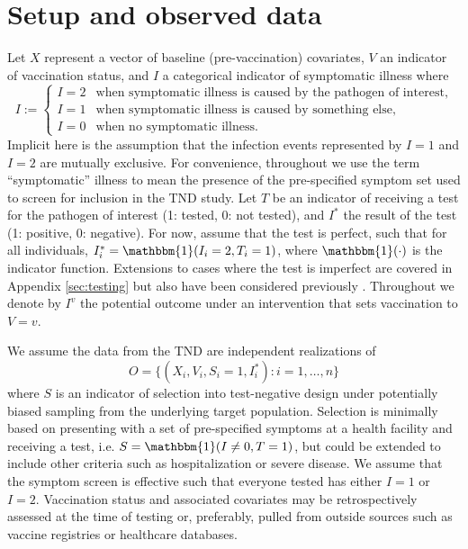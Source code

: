 \documentclass[11pt]{article}
\begin{document}
\section{Setup and observed data} \label{sec:setup}
Let $X$ represent a vector of baseline (pre-vaccination) covariates, $V$ an indicator of vaccination status, and $I$ a categorical indicator of symptomatic illness where
        $$I := \begin{cases} 
        I = 2 & \text{when symptomatic illness is caused by the pathogen of interest}, \\
        I = 1 & \text{when symptomatic illness is caused by something else}, \\
        I = 0 & \text{when no symptomatic illness}.
        \end{cases}$$
 Implicit here is the assumption that the infection events represented by $I = 1$ and $I = 2$ are mutually exclusive. For convenience, throughout we use the term ``symptomatic'' illness to mean the presence of the pre-specified symptom set used to screen for inclusion in the TND study. Let $T$ be an indicator of receiving a test for the pathogen of interest (1: tested, 0: not tested), and $I^*$ the result of the test (1: positive, 0: negative). For now, assume that the test is perfect, such that for all individuals, $I^*_i = \mathbbm{1}(I_i = 2, T_i = 1)$, where $\mathbbm{1}(\cdot)$ is the indicator function. Extensions to cases where the test is imperfect are covered in Appendix \ref{sec:testing} but also have been considered previously \cite{jackson2015effects, sullivan_theoretical_2016}. Throughout we denote by $I^v$ the potential outcome under an intervention that sets vaccination to $V=v$. 
    
We assume the data from the TND are independent realizations of 
$$O = \{(X_i, V_i, S_i = 1, I^*_i) : i = 1, \ldots, n\}$$
where $S$ is an indicator of selection into test-negative design under potentially biased sampling from the underlying target population. Selection is minimally based on presenting with a set of pre-specified symptoms at a health facility and receiving a test, i.e. $S = \mathbbm{1}(I \neq 0, T = 1)$, but could be extended to include other criteria such as hospitalization or severe disease. We assume that the symptom screen is effective such that everyone tested has either $I=1$ or $I=2$. Vaccination status and associated covariates may be retrospectively assessed at the time of testing or, preferably, pulled from outside sources such as vaccine registries or healthcare databases. 
\end{document}

